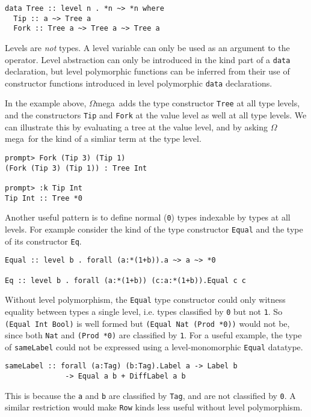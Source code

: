\documentclass[11pt,twoside]{article}
\newcommand{\om}{$\Omega$mega}
\begin{document}
\begin{verbatim}
data Tree :: level n . *n ~> *n where
  Tip :: a ~> Tree a
  Fork :: Tree a ~> Tree a ~> Tree a
\end{verbatim}
\noindent
Levels are {\it not} types. A level variable can only be used
as an argument to the {\tt *} operator. Level abstraction can only
be introduced in the kind part of a {\tt data} declaration, but level polymorphic
functions can be inferred from their use of constructor functions
introduced in level polymorphic {\tt data} declarations.

In the example above,
\om\ adds the type constructor {\tt Tree} at all type levels,
and the constructors {\tt Tip} and {\tt Fork} at the value level
as well at all type levels. We can illustrate this by evaluating
a tree at the value level, and by asking \om\ for the kind of
a simliar term at the type level.

\begin{verbatim}
prompt> Fork (Tip 3) (Tip 1)
(Fork (Tip 3) (Tip 1)) : Tree Int

prompt> :k Tip Int
Tip Int :: Tree *0 
\end{verbatim}

Another useful pattern is to define normal ({\tt *0}) types indexable
by types at all levels. For example consider the kind of the type constructor
{\tt Equal} and the type of its constructor {\tt Eq}.

\begin{verbatim}
Equal :: level b . forall (a:*(1+b)).a ~> a ~> *0

Eq :: level b . forall (a:*(1+b)) (c:a:*(1+b)).Equal c c
\end{verbatim}
Without level polymorphism, the {\tt Equal} type constructor could only
witness equality between types a single level, i.e. types classified by
{\tt *0} but not {\tt *1}. So {\tt (Equal Int Bool)} is well formed
but {\tt (Equal Nat (Prod *0))} would not be, since both {\tt Nat}
and {\tt (Prod *0)} are classified by {\tt *1}. For a useful
example, the type of {\tt sameLabel} could not be expressed
using a level-monomorphic {\tt Equal} datatype.

\begin{verbatim}
sameLabel :: forall (a:Tag) (b:Tag).Label a -> Label b
              -> Equal a b + DiffLabel a b
\end{verbatim}
\noindent
This is because the {\tt a} and {\tt b} are classified by {\tt Tag}, and are not classified by {\tt *0}. A similar restriction would make
{\tt Row} kinds less useful without level polymorphism.
\end{document}
